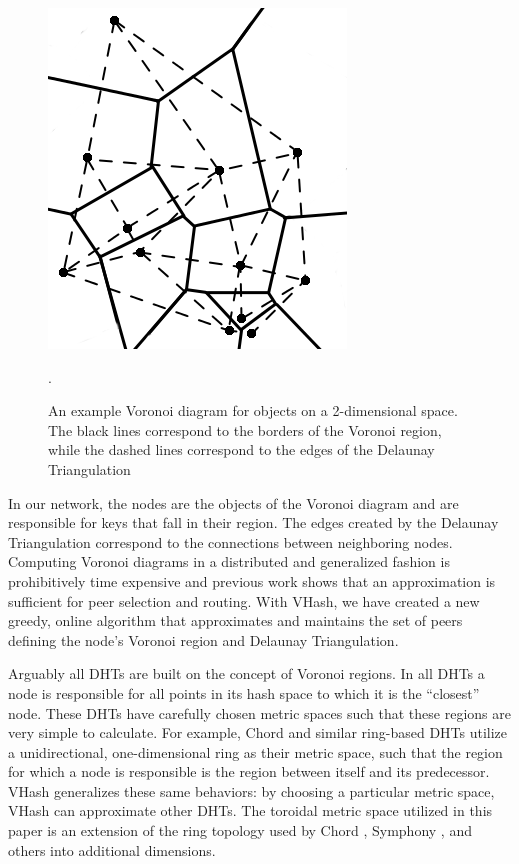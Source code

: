 \documentclass[10pt, conference, letterpaper]{IEEEtran}
\begin{document}
\begin{figure}
	\centering
	\includegraphics[width=0.75\linewidth]{voronoi}
	\caption{An example Voronoi diagram for objects on a 2-dimensional space.  The black lines correspond to the borders of the Voronoi region, while the dashed lines correspond to the edges of the Delaunay Triangulation}.
	\label{voro-ex}
\end{figure}


In our network, the nodes are the objects of the Voronoi diagram and are responsible for keys that fall in their region.
The edges created by the Delaunay Triangulation correspond to the connections between neighboring nodes. 
Computing Voronoi diagrams in a distributed and generalized fashion is prohibitively time expensive and previous work \cite{raynet} shows that an approximation is sufficient for peer selection and routing.
With VHash, we have created a new greedy, online algorithm that approximates and maintains the set of peers defining the node's Voronoi region and Delaunay Triangulation.

Arguably all DHTs are built on the concept of Voronoi regions.
In all DHTs a node is responsible for all points in its hash space to which it is the ``closest'' node.
These DHTs have carefully chosen metric spaces such that these regions are very simple to calculate.
For example, Chord and similar ring-based DHTs utilize a unidirectional, one-dimensional ring as their metric space, such that the region for which a node is responsible is the region between itself and its predecessor.
VHash generalizes these same behaviors: by choosing a particular metric space, VHash can approximate other DHTs.
The toroidal metric space utilized in this paper is an extension of the ring topology used by Chord \cite{chord}, Symphony \cite{manku2003symphony}, and others into additional dimensions. 
\end{document}
